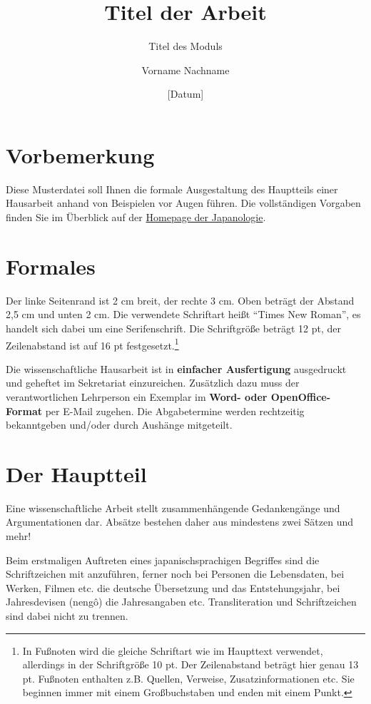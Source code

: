 \documentclass{japo}
\title{Titel der Arbeit}
\subtitle{Titel des Moduls}
\date{[Datum]}
\author{Vorname Nachname}
\begin{document}
\maketitle

\section{Vorbemerkung}
Diese Musterdatei soll Ihnen die formale Ausgestaltung des Hauptteils einer Hausarbeit anhand von Beispielen vor Augen führen. Die vollständigen Vorgaben finden Sie im Überblick auf der \href{\japfacultyhomepage}{Homepage der Japanologie}.

\section{Formales}
Der linke Seitenrand ist 2 cm breit, der rechte 3 cm. Oben beträgt der Abstand 2,5 cm und unten 2 cm. Die verwendete Schriftart heißt \enquote{Times New Roman}, es handelt sich dabei um eine Serifenschrift. Die Schriftgröße beträgt 12 pt, der Zeilenabstand ist auf 16 pt festgesetzt.\footnote{In Fußnoten wird die gleiche Schriftart wie im Haupttext verwendet, allerdings in der Schriftgröße 10 pt. Der Zeilenabstand beträgt hier genau 13 pt. Fußnoten enthalten z.B. Quellen, Verweise, Zusatzinformationen etc. Sie beginnen immer mit einem Großbuchstaben und enden mit einem Punkt.}

Die wissenschaftliche Hausarbeit ist in \textbf{einfacher Ausfertigung} ausgedruckt und geheftet im Sekretariat einzureichen. Zusätzlich dazu muss der verantwortlichen Lehrperson ein Exemplar im \textbf{Word- oder OpenOffice-Format} per E-Mail zugehen. Die Abgabetermine werden rechtzeitig bekanntgeben und/oder durch Aushänge mitgeteilt.

\section{Der Hauptteil}
Eine wissenschaftliche Arbeit stellt zusammenhängende Gedankengänge und Argumentationen dar. Absätze bestehen daher aus mindestens zwei Sätzen und mehr!

Beim erstmaligen Auftreten eines japanischsprachigen Begriffes sind die Schriftzeichen mit anzuführen, ferner noch bei Personen die Lebensdaten, bei Werken, Filmen etc. die deutsche Übersetzung und das Entstehungsjahr, bei Jahresdevisen (nengô) die Jahresangaben etc. Transliteration und Schriftzeichen sind dabei nicht zu trennen.
\end{document}
